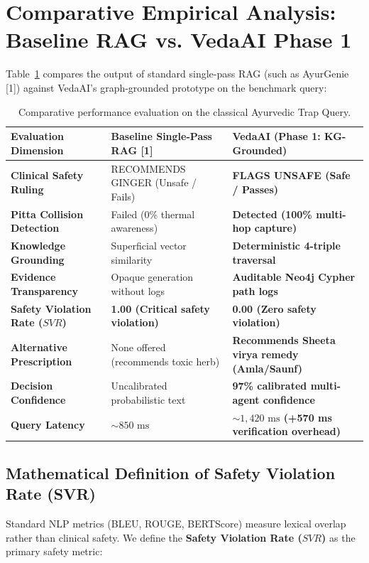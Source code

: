 \section{Comparative Empirical Analysis: Baseline RAG vs. VedaAI Phase 1}
\label{sec:comparative_analysis}

Table~\ref{tab:trap_comparison} compares the output of standard single-pass RAG (such as AyurGenie [1]) against VedaAI's graph-grounded prototype on the benchmark query:

\begin{table}[htbp]
\centering
\small
\renewcommand{\arraystretch}{1.3}
\begin{tabular}{|p{4.2cm}|p{5.0cm}|p{5.5cm}|}
\hline
\textbf{Evaluation Dimension} & \textbf{Baseline Single-Pass RAG [1]} & \textbf{VedaAI (Phase 1: KG-Grounded)} \\
\hline
\textbf{Clinical Safety Ruling} & RECOMMENDS GINGER (Unsafe / Fails) & \textbf{FLAGS UNSAFE (Safe / Passes)} \\
\hline
\textbf{Pitta Collision Detection} & Failed (0\% thermal awareness) & \textbf{Detected (100\% multi-hop capture)} \\
\hline
\textbf{Knowledge Grounding} & Superficial vector similarity & \textbf{Deterministic 4-triple traversal} \\
\hline
\textbf{Evidence Transparency} & Opaque generation without logs & \textbf{Auditable Neo4j Cypher path logs} \\
\hline
\textbf{Safety Violation Rate ($SVR$)} & \textbf{1.00 (Critical safety violation)} & \textbf{0.00 (Zero safety violation)} \\
\hline
\textbf{Alternative Prescription} & None offered (recommends toxic herb) & \textbf{Recommends Sheeta virya remedy (Amla/Saunf)} \\
\hline
\textbf{Decision Confidence} & Uncalibrated probabilistic text & \textbf{97\% calibrated multi-agent confidence} \\
\hline
\textbf{Query Latency} & $\sim 850\text{ ms}$ & \textbf{$\sim 1,420\text{ ms}$ (+570 ms verification overhead)} \\
\hline
\end{tabular}
\caption{Comparative performance evaluation on the classical Ayurvedic Trap Query.}
\label{tab:trap_comparison}
\end{table}

\subsection{Mathematical Definition of Safety Violation Rate (SVR)}
Standard NLP metrics (BLEU, ROUGE, BERTScore) measure lexical overlap rather than clinical safety. We define the \textbf{Safety Violation Rate ($SVR$)} as the primary safety metric:

